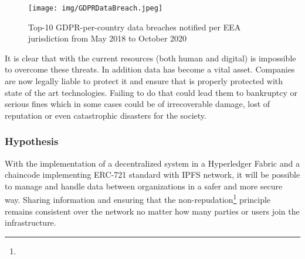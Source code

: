 \begin{figure}[h]
\texttt{[image: img/GDPRDataBreach.jpeg]}
\centering
\caption{Top-10 GDPR-per-country data breaches notified per EEA jurisdiction from May 2018 to October 2020\cite{Statista:online}}
\end{figure}

It is clear that with the current resources (both human and digital) is impossible to overcome these threats. In addition data has become a vital asset. Companies are now legally liable to protect it and ensure that is properly protected with state of the art technologies. Failing to do that could lead them to bankruptcy or serious fines which in some cases could be of irrecoverable damage, lost of reputation or even catastrophic disasters for the society.


\subsubsection{Hypothesis}
\label{analysis_hyp}

With the implementation of a decentralized system in a Hyperledger Fabric and a chaincode implementing \ac{ERC}-721 standard with \ac{IPFS} network, it will be possible to manage and handle data between organizations in a safer and more secure way. Sharing information and ensuring that the non-repudation\footnote{} principle remains consistent over the network no matter how many parties or users join the infrastructure. 